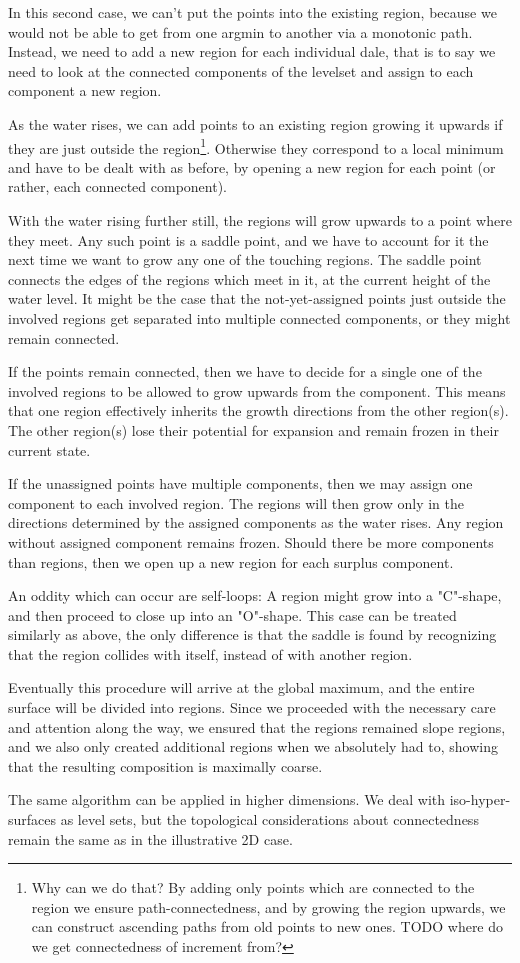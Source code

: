 \documentclass[a4paper,12pt]{paper}
\theoremstyle{plain}
\theoremstyle{definition}
\begin{document}
In this second case, we can't put the points into the existing region, because we would not be able to get from one argmin to another via a monotonic path. Instead, we need to add a new region for each individual dale, that is to say we need to look at the connected components of the levelset and assign to each component a new region.

As the water rises, we can add points to an existing region growing it upwards if they are just outside the region\footnote{Why can we do that? By adding only points which are connected to the region we ensure path-connectedness, and by growing the region upwards, we can construct ascending paths from old points to new ones. TODO where do we get connectedness of increment from?}. Otherwise they correspond to a local minimum and have to be dealt with as before, by opening a new region for each point (or rather, each connected component).

With the water rising further still, the regions will grow upwards to a point where they meet. Any such point is a saddle point, and we have to account for it the next time we want to grow any one of the touching regions. The saddle point connects the edges of the regions which meet in it, at the current height of the water level. It might be the case that the not-yet-assigned points just outside the involved regions get separated into multiple connected components, or they might remain connected.

If the points remain connected, then we have to decide for a single one of the involved regions to be allowed to grow upwards from the component. This means that one region effectively inherits the growth directions from the other region(s). The other region(s) lose their potential for expansion and remain frozen in their current state.

If the unassigned points have multiple components, then we may assign one component to each involved region. The regions will then grow only in the directions determined by the assigned components as the water rises. Any region without assigned component remains frozen. Should there be more components than regions, then we open up a new region for each surplus component.

An oddity which can occur are self-loops: A region might grow into a "C"-shape, and then proceed to close up into an "O"-shape. This case can be treated similarly as above, the only difference is that the saddle is found by recognizing that the region collides with itself, instead of with another region.

Eventually this procedure will arrive at the global maximum, and the entire surface will be divided into regions. Since we proceeded with the necessary care and attention along the way, we ensured that the regions remained slope regions, and we also only created additional regions when we absolutely had to, showing that the resulting composition is maximally coarse.

The same algorithm can be applied in higher dimensions. We deal with iso-hyper-surfaces as level sets, but the topological considerations about connectedness remain the same as in the illustrative 2D case.
\end{document}
